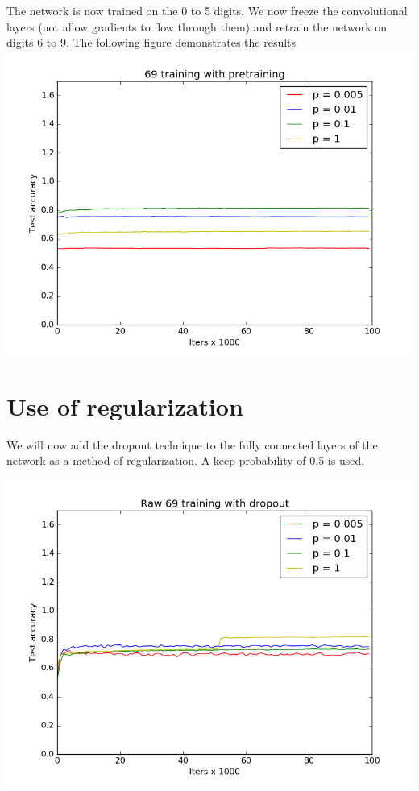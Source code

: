 \documentclass[11pt]{article}
\begin{document}
The network is now trained on the 0 to 5 digits. We now freeze the convolutional layers (not allow gradients to flow through them) and retrain the network on digits 6 to 9. The following figure demonstrates the results \\ 


\includegraphics[width=\textwidth]{69trainingwithpretraining}

\section{Use of regularization}
We will now add the dropout technique to the fully connected layers of the network as a method of regularization.
A keep probability of 0.5 is used. 

\includegraphics[width=\textwidth]{Raw69trainingwithdropout}
\end{document}
